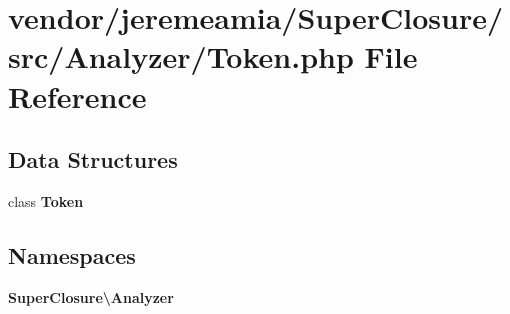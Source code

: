 \section{vendor/jeremeamia/\+Super\+Closure/src/\+Analyzer/\+Token.php File Reference}
\label{jeremeamia_2_super_closure_2src_2_analyzer_2_token_8php}
\subsection*{Data Structures}
\begin{DoxyCompactItemize}
\item 
class {\bf Token}
\end{DoxyCompactItemize}
\subsection*{Namespaces}
\begin{DoxyCompactItemize}
\item 
 {\bf Super\+Closure\textbackslash{}\+Analyzer}
\end{DoxyCompactItemize}
